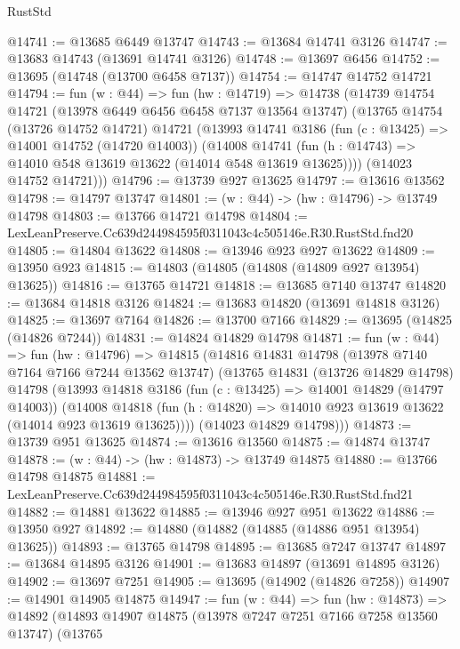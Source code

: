 \begin{lexlean}{RustStd}
\begin{coremodule}
@14741 := @13685 @6449 @13747
@14743 := @13684 @14741 @3126
@14747 := @13683 @14743 (@13691 @14741 @3126)
@14748 := @13697 @6456
@14752 := @13695 (@14748 (@13700 @6458 @7137))
@14754 := @14747 @14752 @14721
@14794 := fun (w : @44) =>
  fun (hw : @14719) =>
  @14738
    (@14739
      @14754
      @14721
      (@13978 @6449 @6456 @6458 @7137 @13564 @13747)
      (@13765
        @14754
        (@13726 @14752 @14721)
        @14721
        (@13993
          @14741
          @3186
          (fun (c : @13425) => @14001 @14752 (@14720 @14003))
          (@14008
            @14741
            (fun (h : @14743) => @14010 @548 @13619 @13622 (@14014 @548 @13619 @13625))))
        (@14023 @14752 @14721)))
@14796 := @13739 @927 @13625
@14797 := @13616 @13562
@14798 := @14797 @13747
@14801 := (w : @44) -> (hw : @14796) -> @13749 @14798
@14803 := @13766 @14721 @14798
@14804 := LexLeanPreserve.Cc639d244984595f0311043c4c505146e.R30.RustStd.fnd20
@14805 := @14804 @13622
@14808 := @13946 @923 @927 @13622
@14809 := @13950 @923
@14815 := @14803 (@14805 (@14808 (@14809 @927 @13954) @13625))
@14816 := @13765 @14721
@14818 := @13685 @7140 @13747
@14820 := @13684 @14818 @3126
@14824 := @13683 @14820 (@13691 @14818 @3126)
@14825 := @13697 @7164
@14826 := @13700 @7166
@14829 := @13695 (@14825 (@14826 @7244))
@14831 := @14824 @14829 @14798
@14871 := fun (w : @44) =>
  fun (hw : @14796) =>
  @14815
    (@14816
      @14831
      @14798
      (@13978 @7140 @7164 @7166 @7244 @13562 @13747)
      (@13765
        @14831
        (@13726 @14829 @14798)
        @14798
        (@13993
          @14818
          @3186
          (fun (c : @13425) => @14001 @14829 (@14797 @14003))
          (@14008
            @14818
            (fun (h : @14820) => @14010 @923 @13619 @13622 (@14014 @923 @13619 @13625))))
        (@14023 @14829 @14798)))
@14873 := @13739 @951 @13625
@14874 := @13616 @13560
@14875 := @14874 @13747
@14878 := (w : @44) -> (hw : @14873) -> @13749 @14875
@14880 := @13766 @14798 @14875
@14881 := LexLeanPreserve.Cc639d244984595f0311043c4c505146e.R30.RustStd.fnd21
@14882 := @14881 @13622
@14885 := @13946 @927 @951 @13622
@14886 := @13950 @927
@14892 := @14880 (@14882 (@14885 (@14886 @951 @13954) @13625))
@14893 := @13765 @14798
@14895 := @13685 @7247 @13747
@14897 := @13684 @14895 @3126
@14901 := @13683 @14897 (@13691 @14895 @3126)
@14902 := @13697 @7251
@14905 := @13695 (@14902 (@14826 @7258))
@14907 := @14901 @14905 @14875
@14947 := fun (w : @44) =>
  fun (hw : @14873) =>
  @14892
    (@14893
      @14907
      @14875
      (@13978 @7247 @7251 @7166 @7258 @13560 @13747)
      (@13765

\end{coremodule}
\end{lexlean}
